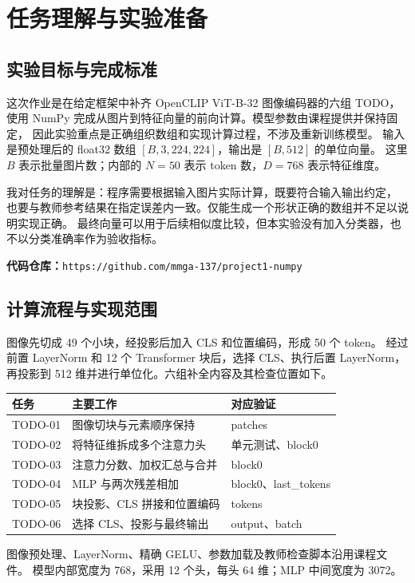 \documentclass[a4paper,12pt]{article}
\begin{document}
\section{任务理解与实验准备}
\subsection{实验目标与完成标准}
这次作业是在给定框架中补齐 OpenCLIP ViT-B-32 图像编码器的六组 TODO，
使用 NumPy 完成从图片到特征向量的前向计算。模型参数由课程提供并保持固定，
因此实验重点是正确组织数组和实现计算过程，不涉及重新训练模型。
输入是预处理后的 float32 数组 $[B,3,224,224]$，输出是 $[B,512]$ 的单位向量。
这里 $B$ 表示批量图片数；内部的 $N=50$ 表示 token 数，$D=768$ 表示特征维度。

我对任务的理解是：程序需要根据输入图片实际计算，既要符合输入输出约定，
也要与教师参考结果在指定误差内一致。仅能生成一个形状正确的数组并不足以说明实现正确。
最终向量可以用于后续相似度比较，但本实验没有加入分类器，也不以分类准确率作为验收指标。

\noindent\textbf{代码仓库：}\texttt{https://github.com/mmga-137/project1-numpy}

\subsection{计算流程与实现范围}
图像先切成 49 个小块，经投影后加入 CLS 和位置编码，形成 50 个 token。
经过前置 LayerNorm 和 12 个 Transformer 块后，选择 CLS、执行后置 LayerNorm，
再投影到 512 维并进行单位化。六组补全内容及其检查位置如下。
\begin{center}
\small
\begin{tabular}{@{}lll@{}}
\toprule
任务 & 主要工作 & 对应验证\\
\midrule
TODO-01 & 图像切块与元素顺序保持 & patches\\
TODO-02 & 将特征维拆成多个注意力头 & 单元测试、block0\\
TODO-03 & 注意力分数、加权汇总与合并 & block0\\
TODO-04 & MLP 与两次残差相加 & block0、last\_tokens\\
TODO-05 & 块投影、CLS 拼接和位置编码 & tokens\\
TODO-06 & 选择 CLS、投影与最终输出 & output、batch\\
\bottomrule
\end{tabular}
\end{center}
图像预处理、LayerNorm、精确 GELU、参数加载及教师检查脚本沿用课程文件。
模型内部宽度为 768，采用 12 个头，每头 64 维；MLP 中间宽度为 3072。
\end{document}
